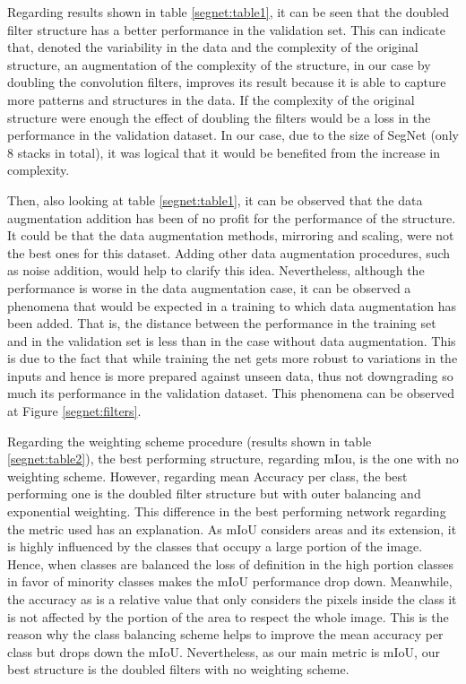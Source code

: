 Regarding results shown in table \ref{segnet:table1}, it can be seen that the doubled filter structure has a better performance in the validation set. This can indicate that, denoted the variability in the data and the complexity of the original structure, an augmentation of the complexity of the structure, in our case by doubling the convolution filters, improves its result because it is able to capture more patterns and structures in the data. If the complexity of the original structure were enough the effect of doubling the filters would be a loss in the performance in the validation dataset. In our case, due to the size of SegNet (only 8 stacks in total), it was logical that it would be benefited from the increase in complexity.\newline

Then, also looking at table \ref{segnet:table1}, it can be observed that the data augmentation addition has been of no profit for the performance of the structure. It could be that the data augmentation methods, mirroring and scaling, were not the best ones for this dataset. Adding other data augmentation procedures, such as noise addition, would help to clarify this idea. Nevertheless, although the performance is worse in the data augmentation case, it can be observed a phenomena that would be expected in a training to which data augmentation has been added. That is, the distance between the performance in the training set and in the validation set is less than in the case without data augmentation. This is due to the fact that while training the net gets more robust to variations in the inputs and hence is more prepared against unseen data, thus not downgrading so much its performance in the validation dataset. This phenomena can be observed at Figure \ref{segnet:filters}.\newline

Regarding the weighting scheme procedure (results shown in table \ref{segnet:table2}), the best performing structure, regarding mIou, is the one with no weighting scheme. However, regarding mean Accuracy per class, the best performing one is the doubled filter structure but with outer balancing and exponential weighting. This difference in the best performing network regarding the metric used has an explanation. As mIoU considers areas and its extension, it is highly influenced by the classes that occupy a large portion of the image. Hence, when classes are balanced the loss of definition in the high portion classes in favor of minority classes makes the mIoU performance drop down. Meanwhile, the accuracy as is a relative value that only considers the pixels inside the class it is not affected by the portion of the area to respect the whole image. This is the reason why the class balancing scheme helps to improve the mean accuracy per class but drops down the mIoU. Nevertheless, as our main metric is mIoU, our best structure is the doubled filters with no weighting scheme.\newline

